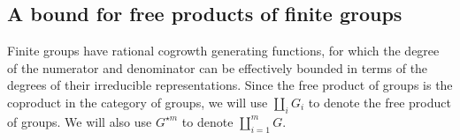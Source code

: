 \documentclass[11pt]{amsart}
\theoremstyle{definition}
\newcommand{\Z}{\mathbb{Z}}
\begin{document}





\subsection{A bound for free products of finite groups}
\label{sec_gen_finite_gps}
Finite groups have rational cogrowth generating functions, for which
the degree of the numerator and denominator can be effectively bounded
in terms of the degrees of their irreducible representations.  Since the free product of groups is the coproduct in the category of groups, we will use $\coprod_i G_i$ to denote the free product of groups.  We will also use 
$G^{\star m}$ to denote $\coprod_{i=1}^m G$.
\end{document}
